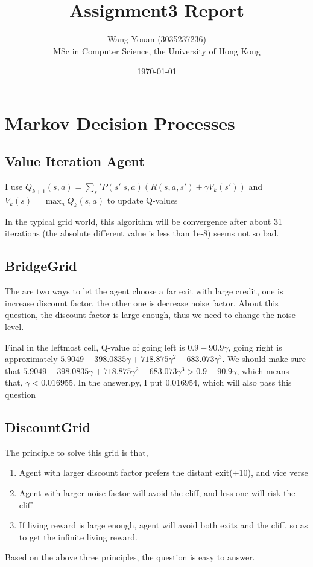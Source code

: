 \documentclass[12pt,a4paper]{article}
\title{\vspace{-2cm}Assignment3 Report\vspace{-2ex}}
\author{Wang Youan (3035237236)\\ MSc in Computer Science, the University of Hong Kong\vspace{-2ex}}
\date{\today\vspace{-1cm}}
\begin{document}
	\maketitle
	\section{Markov Decision Processes}
	\subsection{Value Iteration Agent}
	I use $ Q_{k+1}(s,a)=\sum_s' P(s' | s, a) (R(s,a,s')+\gamma V_k(s')) $ and $ V_k(s)=\max_aQ_k(s,a) $ to update Q-values\par
	In the typical grid world, this algorithm will be convergence after about 31 iterations (the absolute different value is less than 1e-8) seems not so bad.
	\subsection{BridgeGrid}
	The are two ways to let the agent choose a far exit with large credit, one is increase discount factor, the other one is decrease noise factor. About this question, the discount factor is large enough, thus we need to change the noise level.\par
	Final in the leftmost cell, Q-value of going left is $ 0.9 - 90.9\gamma $, going right is approximately $ 5.9049 - 398.0835\gamma + 718.875\gamma^2 - 683.073\gamma^3 $. We should make sure that $ 5.9049 - 398.0835\gamma + 718.875\gamma^2 - 683.073\gamma^3 > 0.9 - 90.9\gamma $, which means that, $ \gamma < 0.016955 $. In the answer.py, I put 0.016954, which will also pass this question
	\subsection{DiscountGrid}
	The principle to solve this grid is that, 
	\begin{enumerate}
		\vspace{-2ex}\item Agent with larger discount factor prefers the distant exit(+10), and vice verse
		\vspace{-1ex}\item Agent with larger noise factor will avoid the cliff, and less one will risk the cliff
		\vspace{-1ex}\item If living reward is large enough, agent will avoid both exits and the cliff, so as to get the infinite living reward.
	\end{enumerate}
	\vspace{-2ex}Based on the above three principles, the question is easy to answer.
\end{document}
